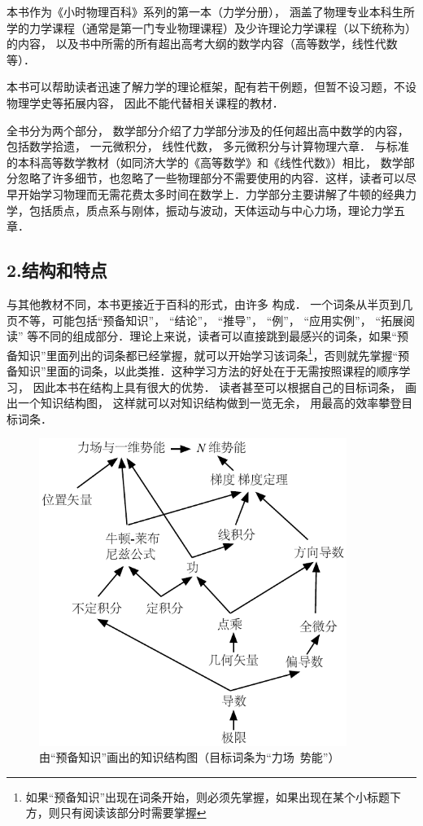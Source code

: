 本书作为《小时物理百科》系列的第一本（力学分册）， 涵盖了物理专业本科生所学的力学课程（通常是第一门专业物理课程）及少许理论力学课程（以下统称为）的内容， 以及书中所需的所有超出高考大纲的数学内容（高等数学，线性代数等）． 

本书可以帮助读者迅速了解力学的理论框架，配有若干例题，但暂不设习题，不设物理学史等拓展内容， 因此不能代替相关课程的教材．

全书分为两个部分， 数学部分介绍了力学部分涉及的任何超出高中数学的内容， 包括数学拾遗， 一元微积分， 线性代数， 多元微积分与计算物理六章． 与标准的本科高等数学教材（如同济大学的《高等数学》和《线性代数》）相比， 数学部分忽略了许多细节，也忽略了一些物理部分不需要使用的内容．这样，读者可以尽早开始学习物理而无需花费太多时间在数学上．力学部分主要讲解了牛顿的经典力学，包括质点，质点系与刚体，振动与波动，天体运动与中心力场，理论力学五章．

\subsection{2.结构和特点}
与其他教材不同，本书更接近于百科的形式，由许多 构成． 一个词条从半页到几页不等，可能包括“预备知识”， “结论”， “推导”， “例”， “应用实例”， “拓展阅读” 等不同的组成部分．理论上来说，读者可以直接跳到最感兴的词条，如果“预备知识”里面列出的词条都已经掌握，就可以开始学习该词条\footnote{如果“预备知识”出现在词条开始，则必须先掌握，如果出现在某个小标题下方，则只有阅读该部分时需要掌握}，否则就先掌握“预备知识”里面的词条，以此类推．这种学习方法的好处在于无需按照课程的顺序学习， 因此本书在结构上具有很大的优势．  读者甚至可以根据自己的目标词条， 画出一个知识结构图， 这样就可以对知识结构做到一览无余， 用最高的效率攀登目标词条． %

\begin{figure}[ht]
\centering
\includegraphics[width=10cm]{./figures/flowchart_example.pdf}
\caption{由“预备知识”画出的知识结构图（目标词条为“力场\ 势能”）}
\end{figure}

